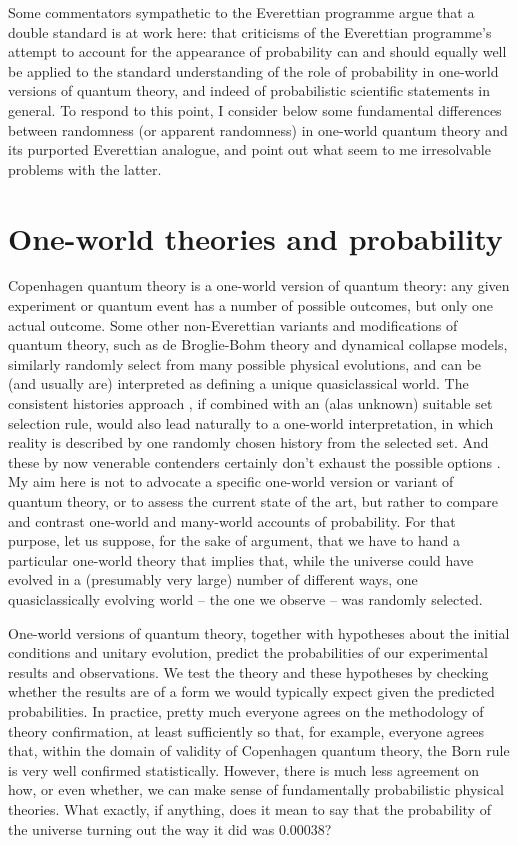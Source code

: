 \documentclass[aps,
pra,epsfig,12pt,nofootinbib]{revtex4}
\begin{document}
Some commentators sympathetic to the Everettian programme \cite{greavesmyrvoldvol, papineauvol} 
argue that a double standard is at work here: that criticisms
of the Everettian programme's attempt to account for the appearance
of probability can and should equally well be applied to the
standard understanding of the role of probability in one-world
versions of quantum theory, and indeed of probabilistic scientific
statements in general.   To respond to this point, I consider below
some fundamental differences between 
randomness (or apparent randomness) in one-world quantum theory and 
its purported Everettian analogue, and point out what seem to me
irresolvable problems with the latter.

\section{One-world theories and probability}\label{oneworldprob}

Copenhagen quantum theory is a one-world version of quantum theory:
any given experiment or quantum event has a number of possible
outcomes, but only one actual outcome.  Some other non-Everettian
variants and modifications of quantum theory, such as de Broglie-Bohm
theory and dynamical collapse models, similarly randomly select from
many possible physical evolutions, and can be (and usually are)
interpreted as defining a unique quasiclassical world.  The consistent
histories approach \cite{hartlevol}, if combined with 
an (alas unknown) suitable set
selection rule, would also lead naturally to a one-world
interpretation, in which reality is described by one randomly chosen
history from the selected set.  And these by now venerable contenders
certainly don't exhaust the possible options \cite{akoneworld}.
My aim here is not to advocate a specific one-world version or variant
of quantum theory, or to assess the current state of the art, but
rather to compare and contrast one-world and many-world accounts of
probability.  For that purpose, let us suppose, for the sake of
argument, that we have to hand a particular one-world theory that 
implies that, while the universe could have evolved in a (presumably
very large) number of different ways, one quasiclassically evolving
world -- the one we observe -- was randomly selected.

One-world versions of quantum theory, together with hypotheses about
the initial conditions and unitary evolution, predict the
probabilities of our experimental results and observations.  We test
the theory and these hypotheses by checking whether the results are of
a form we would typically expect given the predicted probabilities.
In practice, pretty much everyone agrees on the methodology of theory
confirmation, at least sufficiently so that, for example, everyone
agrees that, within the domain of validity of Copenhagen quantum
theory, the Born rule is very well confirmed statistically.  However,
there is much less agreement on how, or even whether, we can make
sense of fundamentally probabilistic physical theories.  What exactly, if
anything, does it mean to say that the probability of the universe
turning out the way it did was $0.00038$?
\end{document}
